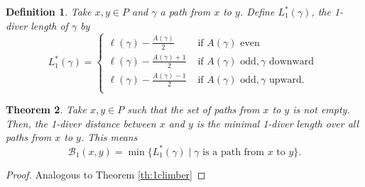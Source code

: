 \documentclass{article}[12pt]
\theoremstyle{exampstyle}
\newtheorem{theorem}{Theorem}[section]
\newtheorem{definition}[theorem]{Definition}
\theoremstyle{remark}
\newcommand{\B}{\mathcal{B}}
\begin{document}
\begin{definition}
    Take $x,y \in P$ and $\gamma$ a path from $x$ to $y$. Define $L^*_1(\gamma)$, the \textit{1-diver length} of $\gamma$ by 
     \begin{equation*}
        L^*_1(\gamma) =  \left\{ 
        \begin{array}{cc}
            \ell(\gamma) - \frac{A(\gamma)}{2} &  \text{ if } A(\gamma) \text{ even}\\
            \ell(\gamma) - \frac{A(\gamma)+1}{2} &  \text{ if } A(\gamma) \text{ odd}, \gamma \text{ downward }\\
            \ell(\gamma) - \frac{A(\gamma)-1}{2} &  \text{ if } A(\gamma) \text{ odd}, \gamma \text{ upward}.\\
        \end{array}
        \right.
    \end{equation*}
\end{definition}
\begin{theorem}
    Take $x,y \in P$ such that the set of paths from $x$ to $y$ is not empty. Then, the 1-diver distance between $x$ and $y$ is the minimal 1-diver length over all paths from $x$ to $y$. This means \[\B_1(x,y) = \min \{ L^*_1(\gamma) \mid \gamma \text { is a  path from } x \text{ to } y\}. \]
    \label{th:1diver}
\end{theorem}
\begin{proof}
    Analogous to Theorem \ref{th:1climber}
\end{proof}
\end{document}
